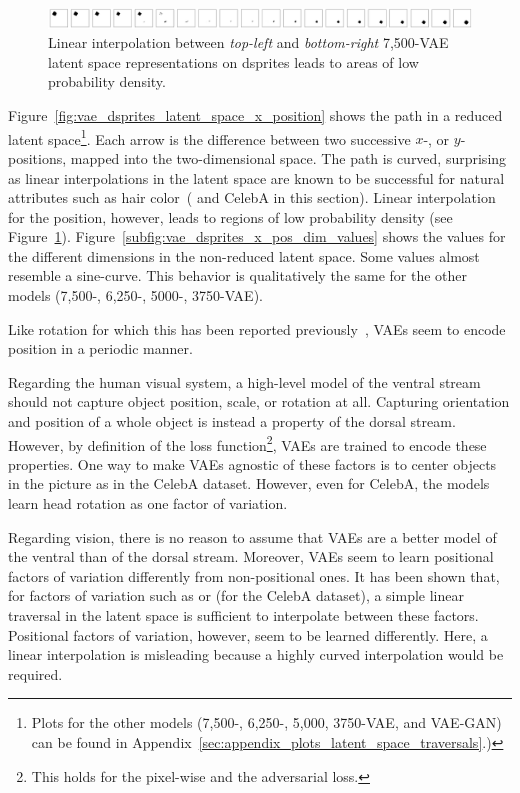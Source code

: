 \begin{figure}
    \centering
    \includegraphics[width=\textwidth]{images/latent_space_traversals/vae_dsprites_7500_position.png}
    \caption{Linear interpolation between \textit{top-left} and \textit{bottom-right} 7,500-\ac{VAE} latent space representations on dsprites leads to areas of low probability density.}
    \label{fig:vae_7500_dsprites_position_interpolation}
\end{figure}

Figure~\ref{fig:vae_dsprites_latent_space_x_position} shows the path in a reduced latent space\footnote{Plots for the other models (7,500-, 6,250-, 5,000, 3750-\ac{VAE}, and \ac{VAE}-\ac{GAN}) can be found in Appendix~\ref{sec:appendix_plots_latent_space_traversals}.)}.
Each arrow is the difference between two successive $x$-, or $y$-positions, mapped into the two-dimensional space.
The path is curved, surprising as linear interpolations in the latent space are known to be successful for natural attributes such as hair color~(\citep{radford2016deep} and CelebA in this section).
Linear interpolation for the position, however, leads to regions of low probability density (see Figure~\ref{fig:vae_7500_dsprites_position_interpolation}).
Figure~\ref{subfig:vae_dsprites_x_pos_dim_values} shows the values for the different dimensions in the non-reduced latent space.
Some values almost resemble a sine-curve.
This behavior is qualitatively the same for the other models (7,500-, 6,250-, 5000-, 3750-\ac{VAE}).

Like rotation for which this has been reported previously~\citep{chen2018isolating}, \acp{VAE} seem to encode position in a periodic manner.

Regarding the human visual system, a high-level model of the ventral stream should not capture object position, scale, or rotation at all.
Capturing orientation and position of a whole object is instead a property of the dorsal stream.
However, by definition of the loss function\footnote{This holds for the pixel-wise and the adversarial loss.}, \acp{VAE} are trained to encode these properties.
One way to make \acp{VAE} agnostic of these factors is to center objects in the picture as in the CelebA dataset.
However, even for CelebA, the models learn head rotation as one factor of variation.

Regarding vision, there is no reason to assume that \acp{VAE} are a better model of the ventral than of the dorsal stream.
Moreover, \acp{VAE} seem to learn positional factors of variation differently from non-positional ones.
It has been shown that, for factors of variation such as  or  (for the CelebA dataset), a simple linear traversal in the latent space is sufficient to interpolate between these factors.
Positional factors of variation, however, seem to be learned differently.
Here, a linear interpolation is misleading because a highly curved interpolation would be required.

